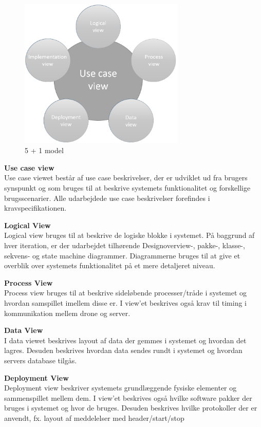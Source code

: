\begin{figure}[H]
	\centering
	\includegraphics[width=0.7\textwidth]{Billeder/Udviklingsproces/n+1}
	\caption{5 + 1 model}
	\label{fig:n+1}
\end{figure}

\newpage


\textbf{Use case view}\\
Use case viewet består af use case beskrivelser, der er udviklet ud fra brugers synspunkt og som bruges til at beskrive systemets funktionalitet og forskellige brugsscenarier. Alle udarbejdede use case beskrivelser forefindes i kravspecifikationen.

\textbf{Logical View}\\
Logical view bruges til at beskrive de logiske blokke i systemet. På baggrund af hver iteration, er der udarbejdet tilhørende Designoverview-, pakke-, klasse-, sekvens- og state machine diagrammer. Diagrammerne bruges til at give et overblik over systemets funktionalitet på et mere detaljeret niveau.

\textbf{Process View}\\
Process view bruges til at beskrive sideløbende processer/tråde i systemet og hvordan samspillet imellem disse er. I view'et beskrives også krav til timing i kommunikation mellem drone og server.

\textbf{Data View}\\
I data viewet beskrives layout af data der gemmes i systemet og hvordan det lagres. Desuden beskrives hvordan data sendes rundt i systemet og hvordan servers database tilgås.

\textbf{Deployment View}\\
Deployment view beskriver systemets grundlæggende fysiske elementer og sammenspillet mellem dem. I view'et beskrives også hvilke software pakker der bruges i systemet og hvor de bruges. Desuden beskrives hvilke protokoller der er anvendt, fx. layout af meddelelser med header/start/stop

